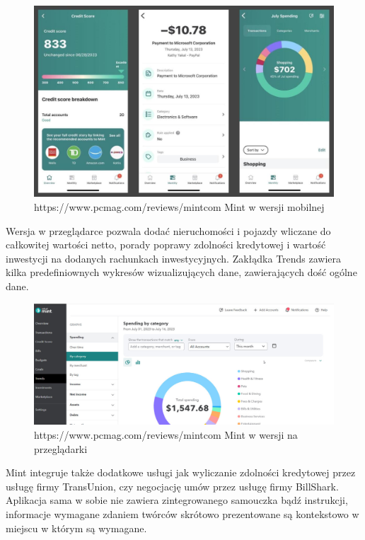 \documentclass[a4paper,10pt, twoside]{report}
\begin{document}
\begin{large}
\begin{figure}[H]           %
    \centering
    \includegraphics[width=12cm]{figures/pcmag_mintmobile_05OMSsUmroXJ6F6sETKpH9R-50.fit_lim.size_1152x.jpg}
    \caption{https://www.pcmag.com/reviews/mintcom Mint w wersji mobilnej}
    \label{mintmobile}
\end{figure}

{Wersja w przeglądarce pozwala dodać nieruchomości i pojazdy wliczane do 
całkowitej wartości netto, porady poprawy zdolności kredytowej i wartość 
inwestycji na dodanych rachunkach inwestycyjnych. Zakłądka Trends zawiera 
kilka predefiniownych wykresów wizualizujących dane, zawierających dość ogólne 
dane.}

\begin{figure}[H]           %
    \centering
    \includegraphics[width=12cm]{figures/pcmag_mintweb_05OMSsUmroXJ6F6sETKpH9R-51.fit_lim.size_1152x.jpg}
    \caption{https://www.pcmag.com/reviews/mintcom Mint w wersji na przeglądarki}
    \label{fig:mintweb}
\end{figure}

{Mint integruje także dodatkowe usługi jak wyliczanie zdolności kredytowej przez 
usługę firmy TransUnion, czy negocjację umów przez usługę firmy BillShark. 
Aplikacja sama w sobie nie zawiera zintegrowanego samouczka bądź instrukcji, 
informacje wymagane zdaniem twórców skrótowo prezentowane są kontekstowo w miejscu w 
którym są wymagane.}


\end{large}
\end{document}
